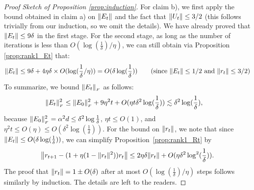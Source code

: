 \begin{proof}[Proof Sketch of Proposition \ref{prop:induction}]
For claim b), we first apply the bound obtained in claim a) on $\|E_t\|$ and the fact that $\|U_t\| \le 3/2$
(this follows trivially from our induction, so we omit the details).
We have already proved that $\|E_t\| \le 9\delta$ in the first stage.
For the second stage, as long as the number of iterations is less than $O(\log(\frac 1 {\delta}) / \eta)$,
we can still obtain via Proposition \ref{prop:rank1_Et} that:
\[ \norm{E_t} \le 9\delta + 4\eta\delta \times O(\log(\frac 1 {\delta} / \eta))
= O(\delta \log(\frac 1 {\delta})) \tag{since $\norm{E_t} \le 1/2$ and $\norm{r_t} \le 3/2$} \]
To summarize, we bound $\|E_t\|_{_{F}}$ as follows:
	\begin{align*}
		\|E_{t}\|_{_{F}}^2 & \le \|E_0\|_{_{F}}^2 + 9\eta^2 t + O(\eta t \delta^2 \log(\frac 1 {\delta})) \lesssim \delta^2\log(\frac 1{\delta}),
	\end{align*}
	because $\|E_0\|_{_{F}}^2 = \alpha^2 d \le \delta^2 \log{\frac 1 {\delta}}$,
	$\eta t \le O(1)$,
	and	$\eta^2 t \le O(\eta) \le O(\delta^2 \log(\frac 1{\delta}))$.
		For the bound on $\|r_t\|$, we note that since $\|E_t\| \le O(\delta \log(\frac 1 {\delta}))$, we can simplify Proposition~\ref{prop:rank1_Rt} by 
\begin{align*}
	\left\|r_{t+1} -  (1 + \eta (1 - \|r_t\|^2))r_t\right\|
		\le 2\eta\delta\|r_t\| + O(\eta\delta^2\log^2(\frac 1 {\delta})).
\end{align*}
	The proof that $\|r_t\| = 1 \pm O(\delta)$ after at most $O(\log(\frac 1{\delta}) / \eta)$ steps follows similarly by induction.
	The details are left to the readers.
\end{proof}

